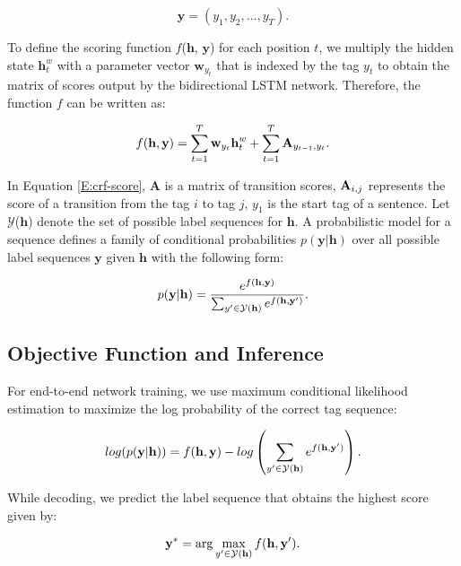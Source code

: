 \documentclass[11pt,a4paper]{article}
\begin{document}
\begin{equation}
\textbf{y} = ({y}_{1}, {y}_{2}, . . . , {y}_{T}).
\label{E:crf-label}
\end{equation}

To define the scoring function $f$($\textbf{h}$, $\textbf{y}$) for each position $t$, we multiply the hidden state $\textbf{h}^w_t$ with a parameter vector $\textbf{w}_{y_{t}}$ that is indexed by the tag ${y}_{t}$ to obtain the matrix of scores output by the bidirectional LSTM network. Therefore, the function $f$ can be written as:

\begin{equation}
f(\textbf{h}, \textbf{y}) = \sum\limits_{t=1}^{T} \textbf{w}_{y_{t}} \textbf{h}^w_t + \sum\limits_{t=1}^{T} \textbf A_{y_{t-1},y_t}.
\label{E:crf-score}
\end{equation}

In Equation \ref{E:crf-score}, $\textbf{A}$ is a matrix of transition scores, $\textbf A_{i,j}$ represents the score of a transition from the tag $i$ to tag $j$, $y_{1}$ is the start tag of a sentence. Let $\mathcal{Y}$($\textbf{h}$) denote the set of possible label sequences for $\textbf{h}$. A probabilistic model for a sequence defines a family of conditional probabilities $p(\textbf{y}|\textbf{h})$ over all possible label sequences $\textbf{y}$ given $\textbf{h}$ with the following form:

\begin{equation}
p(\textbf{y}|\textbf{h}) = \frac{e^{f(\textbf h, \textbf y)}} {\sum_{y'\in\mathcal{Y}(\textbf h)} e^{f(\textbf{h}, \textbf y')}}.
\label{E:crf-prob}
\end{equation}

\subsection{Objective Function and Inference}
For end-to-end network training, we use maximum conditional likelihood estimation to maximize the log probability of the correct tag sequence:

\begin{equation*}
log(p(\textbf{y}|\textbf{h})) = f(\textbf{h}, \textbf{y}) - log\left( \sum\limits_{y'\in\mathcal{Y}(\textbf h)} e^{f(\textbf{h}, \textbf y')} \right).
\label{E:crf-loss}
\end{equation*}

While decoding, we predict the label sequence that obtains the highest score given by:

\begin{equation}
\textbf{y}^{*} = \arg\max_{y'\in\mathcal{Y}(\textbf h)} f(\textbf{h}, \textbf y').
\end{equation}
\end{document}
